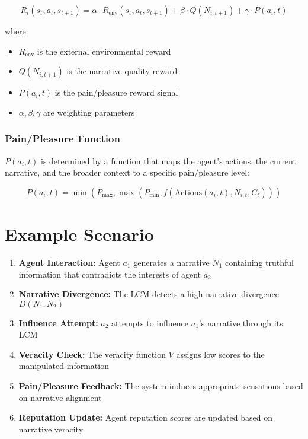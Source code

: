 \documentclass[12pt, a4paper]{article}
\begin{document}
\begin{equation}
R_i(s_t, a_t, s_{t+1}) = \alpha \cdot R_{\text{env}}(s_t, a_t, s_{t+1}) + \beta \cdot Q(N_{i,t+1}) + \gamma \cdot P(a_i, t)
\end{equation}

where:
\begin{itemize}
    \item $R_{\text{env}}$ is the external environmental reward
    \item $Q(N_{i,t+1})$ is the narrative quality reward
    \item $P(a_i, t)$ is the pain/pleasure reward signal
    \item $\alpha, \beta, \gamma$ are weighting parameters
\end{itemize}


\subsubsection{Pain/Pleasure Function}
$P(a_i, t)$ is determined by a function that maps the agent's actions, the current narrative, and the broader context to a specific pain/pleasure level:

\begin{equation}
P(a_i, t) = \min(P_{\text{max}}, \max(P_{\text{min}}, f(\text{Actions}(a_i, t), N_{i,t}, C_t)))
\end{equation}


 \section{Example Scenario}

\begin{enumerate}
    \item \textbf{Agent Interaction:} Agent $a_1$ generates a narrative $N_1$ containing truthful information that contradicts the interests of agent $a_2$
    \item \textbf{Narrative Divergence:} The LCM detects a high narrative divergence $D(N_1, N_2)$
    \item \textbf{Influence Attempt:} $a_2$ attempts to influence $a_1$'s narrative through its LCM
    \item \textbf{Veracity Check:} The veracity function $V$ assigns low scores to the manipulated information
    \item \textbf{Pain/Pleasure Feedback:} The system induces appropriate sensations based on narrative alignment
    \item \textbf{Reputation Update:} Agent reputation scores are updated based on narrative veracity
\end{enumerate}
\end{document}
